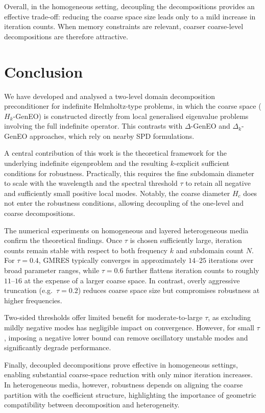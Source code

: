 \documentclass[numbers,webpdf,imaiai]{ima-authoring-template}%
\theoremstyle{thmstyletwo}%
\numberwithin{equation}{section}
\numberwithin{equation}{section}
\begin{document}
{Overall, in the homogeneous setting, decoupling the decompositions provides an effective trade-off: 
reducing the coarse space size leads only to a mild increase in iteration counts.
When memory constraints are relevant, coarser coarse-level decompositions are therefore attractive.


\section{Conclusion}

We have developed and analysed a two-level domain decomposition preconditioner for indefinite Helmholtz-type problems, 
in which the coarse space ($H_k$-GenEO) is constructed directly from local generalised eigenvalue problems 
involving the full indefinite operator.  This contrasts with $\Delta$-GenEO and $\Delta_k$-GenEO approaches, which rely on nearby SPD formulations.

A central contribution of this work is the theoretical framework for the underlying indefinite eigenproblem and the 
resulting $k$-explicit sufficient conditions for robustness. Practically, this requires the fine subdomain diameter 
to scale with the wavelength and the spectral threshold $\tau$ to retain all negative and sufficiently small positive local modes. 
Notably, the coarse diameter $H_c$ does not enter the robustness conditions, allowing decoupling of the one-level and coarse decompositions.

The numerical experiments on homogeneous and layered heterogeneous media confirm the theoretical findings. 
Once $\tau$ is chosen sufficiently large, iteration counts remain stable with respect to both frequency $k$ and subdomain count $N$. 
For $\tau=0.4$, GMRES typically converges in approximately $14$--$25$ iterations over broad parameter ranges, 
while $\tau=0.6$ further flattens iteration counts to roughly $11$--$16$ at the expense of a larger coarse space. 
In contrast, overly aggressive truncation (e.g.\ $\tau=0.2$) reduces coarse space size but compromises robustness at higher frequencies. 

Two-sided thresholds offer limited benefit for moderate-to-large $\tau$, as excluding mildly negative modes has 
negligible impact on convergence.  However, for small $\tau$, imposing a negative lower bound can remove oscillatory unstable modes 
and significantly degrade performance.

Finally, decoupled decompositions prove effective in homogeneous settings, enabling substantial coarse-space reduction 
with only minor iteration increases. In heterogeneous media, however, robustness depends on aligning the coarse partition 
with the coefficient structure, highlighting the importance of geometric compatibility between decomposition and heterogeneity.

}
\end{document}

